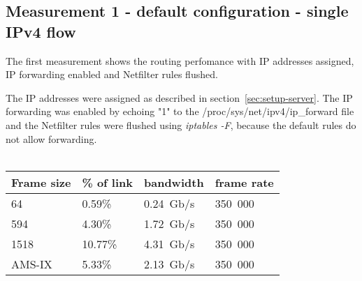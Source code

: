 
\subsection{Measurement 1 - default configuration - single IPv4 flow}
The first measurement shows the routing perfomance with
IP addresses assigned, IP forwarding enabled and Netfilter rules flushed.

The IP addresses were assigned as described in section~\ref{sec:setup-server}.
The IP forwarding was enabled by echoing "1" to the /proc/sys/net/ipv4/ip\_forward file and the Netfilter rules
were flushed using {\it{iptables -F}}, because the default rules do not allow forwarding.
\\
\\
\begin{tabular}{ | l | l | l | l | }
\hline
Frame size & \% of link & bandwidth & frame rate \\
\hline
64     &  0.59\% & 0.24~Gb/s & 350~000 \\
594    &  4.30\% & 1.72~Gb/s & 350~000 \\
1518   & 10.77\% & 4.31~Gb/s & 350~000 \\
AMS-IX &  5.33\% & 2.13~Gb/s & 350~000 \\
\hline
\end{tabular}
